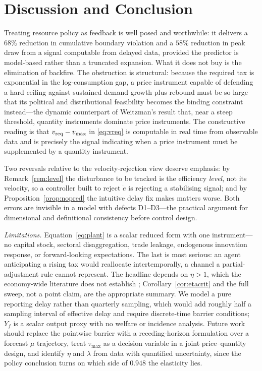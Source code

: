 \documentclass[conference,letterpaper,10pt]{IEEEtran}
\theoremstyle{plain}
\theoremstyle{remark}
\newcommand{\edot}{\dot{e}}
\begin{document}
\section{Discussion and Conclusion}
Treating resource policy as feedback is well posed and worthwhile: it
delivers a $68\%$ reduction in cumulative boundary violation and a
$58\%$ reduction in peak draw from a signal computable from delayed
data, provided the predictor is model-based rather than a truncated
expansion. What it does not buy is the elimination of backfire. The
obstruction is structural: because the required tax is exponential in
the log-consumption gap, a price instrument capable of defending a
hard ceiling against sustained demand growth plus rebound must be so
large that its political and distributional feasibility becomes the
binding constraint instead---the dynamic counterpart of Weitzman's
result \cite{weitzman1974} that, near a steep threshold, quantity
instruments dominate price instruments. The constructive reading is
that $v_{\rm req}-v_{\max}$ in \eqref{eq:vreq} is computable in real
time from observable data and is precisely the signal indicating when
a price instrument must be supplemented by a quantity instrument.

Two reversals relative to the velocity-rejection view deserve emphasis:
by Remark~\ref{rem:level} the disturbance to be tracked is the
efficiency \emph{level}, not its velocity, so a controller built to
reject $\edot$ is rejecting a stabilising signal; and by
Proposition~\ref{prop:nopred} the intuitive delay fix makes matters
worse. Both errors are invisible in a model with defects D1--D3---the
practical argument for dimensional and definitional consistency before
control design.

\emph{Limitations.} Equation~\eqref{eq:plant} is a scalar reduced form
with one instrument---no capital stock, sectoral disaggregation, trade
leakage, endogenous innovation response, or forward-looking
expectations. The last is most serious: an agent anticipating a rising
tax would reallocate intertemporally, a channel a partial-adjustment
rule cannot represent. The headline depends on $\eta>1$, which the
economy-wide literature does not establish \cite{gillingham2016};
Corollary~\ref{cor:etacrit} and the full sweep, not a point claim, are
the appropriate summary. We model a pure reporting delay rather than
quarterly sampling, which would add roughly half a sampling interval of
effective delay and require discrete-time barrier conditions; $Y_f$ is
a scalar output proxy with no welfare or incidence analysis. Future
work should replace the pointwise barrier with a receding-horizon
formulation \cite{mayne2014} over a forecast $\mu$ trajectory, treat
$\tau_{\max}$ as a decision variable in a joint price--quantity design,
and identify $\eta$ and $\lambda$ from data with quantified
uncertainty, since the policy conclusion turns on which side of
$0.948$ the elasticity lies.
\end{document}

